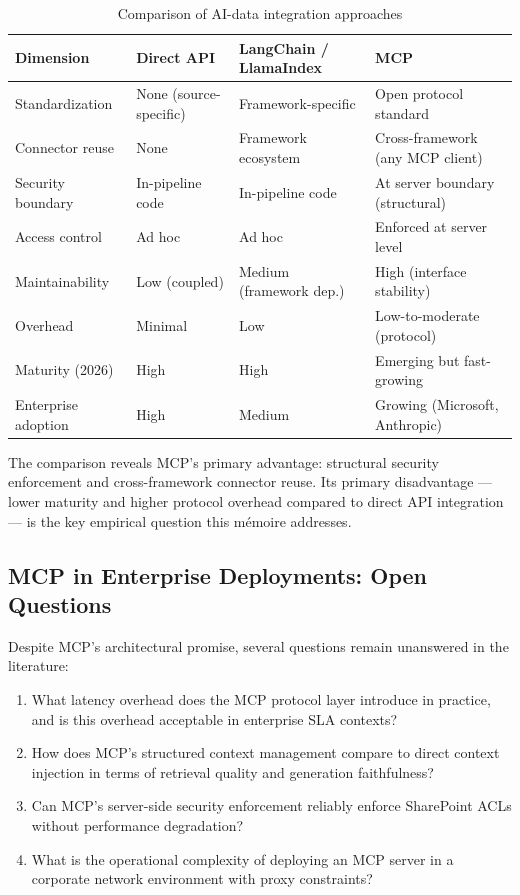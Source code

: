 \begin{table}[H]
\centering
\caption{Comparison of AI-data integration approaches}
\label{tab:mcp-comparison}
\begin{tabularx}{\textwidth}{@{}lXXX@{}}
\toprule
\textbf{Dimension} & \textbf{Direct API} & \textbf{LangChain / LlamaIndex} & \textbf{MCP} \\
\midrule
Standardization & None (source-specific) & Framework-specific & Open protocol standard \\
Connector reuse & None & Framework ecosystem & Cross-framework (any MCP client) \\
Security boundary & In-pipeline code & In-pipeline code & At server boundary (structural) \\
Access control & Ad hoc & Ad hoc & Enforced at server level \\
Maintainability & Low (coupled) & Medium (framework dep.) & High (interface stability) \\
Overhead & Minimal & Low & Low-to-moderate (protocol) \\
Maturity (2026) & High & High & Emerging but fast-growing \\
Enterprise adoption & High & Medium & Growing (Microsoft, Anthropic) \\
\bottomrule
\end{tabularx}
\end{table}

The comparison reveals MCP's primary advantage: structural security enforcement and cross-framework connector reuse. Its primary disadvantage — lower maturity and higher protocol overhead compared to direct API integration — is the key empirical question this mémoire addresses.

\subsection{MCP in Enterprise Deployments: Open Questions}

Despite MCP's architectural promise, several questions remain unanswered in the literature:

\begin{enumerate}
  \item What latency overhead does the MCP protocol layer introduce in practice, and is this overhead acceptable in enterprise SLA contexts?
  \item How does MCP's structured context management compare to direct context injection in terms of retrieval quality and generation faithfulness?
  \item Can MCP's server-side security enforcement reliably enforce SharePoint ACLs without performance degradation?
  \item What is the operational complexity of deploying an MCP server in a corporate network environment with proxy constraints?
\end{enumerate}

